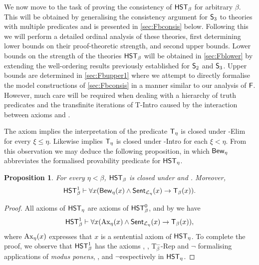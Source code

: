 \documentclass[UKenglish,cleveref,DIV=12]{scrartcl}
\newtheorem{proposition}[lemma]{Proposition}
\theoremstyle{definition}
\theoremstyle{definition}
\begin{document}
We now move to the task of proving the consistency of $\mathsf{HST}_\beta$ for arbitrary
$\beta$. This will be obtained by generalising the consistency argument for
$\mathsf{S}_3$ to theories with multiple predicates and is presented in
\cref{sec:Fbconsis} below. Following this we will perform a detailed ordinal
analysis of these theories, first determining lower bounds on their
proof-theoretic strength, and second upper bounds. Lower bounds on the strength
of the theories $\mathsf{HST}_\beta$ will be obtained in \cref{sec:Fblower} by
extending the well-ordering results previously established for $\mathsf{S}_2$ and
$\mathsf{S}_3$. Upper bounds are determined in \cref{sec:Fbupper1} where we
attempt to directly formalise the model constructions of \cref{sec:Fbconsis}
in a manner similar to our analysis of $\mathsf{F}$. However, much care will be required when
dealing with a hierarchy of truth predicates and the transfinite iterations of
T-Intro caused by the interaction between axioms \Uni\eta and \Rep\eta.

The axiom \Del\eta implies the interpretation of the predicate $\mathsf{T}_\eta$ is closed under \textT\xi-Elim for every $\xi\le\eta$. Likewise \Rep\eta implies $\mathsf{T}_\eta$ is closed under \textT\xi-Intro for each $\xi<\eta$. From this observation we may deduce the following proposition, in which $\mathsf{Bew}_\eta$ abbreviates the formalised provability predicate for $\mathsf{HST}_\eta$.
\begin{proposition}\label{prop:FFreflec}
 For every $\eta<\beta$, $\mathsf{HST}_\beta$ is closed under \Nec\eta and \Conec\eta. Moreover, \[\mathsf{HST}_\beta^1\vdash \forall x( \mathsf{Bew}_{\eta}(x)\land\mathsf{Sent}_{\mathcal{L}_\eta}(x)\rightarrow \mathsf{T}_\beta(x)).\]
\end{proposition}
\begin{proof}
All axioms of $\mathsf{HST}_\eta$ are axioms of $\mathsf{HST}_\beta^0$, and by \Nec\beta we have
\begin{align*}
  \mathsf{HST}_\beta^1\vdash \forall x( \mathrm{Ax}_{\eta}(x)\land\mathsf{Sent}_{\mathcal{L}_\eta}(x)\rightarrow \mathsf{T}_\beta(x)),
\end{align*}
where $\mathrm{Ax}_\eta(x)$ expresses that $x$ is a sentential axiom of $\mathsf{HST}_\eta$.
To complete the proof, we observe that $\mathsf{HST}_\beta^1$ has the axioms
\Imp\beta, \Del\beta, T$_\beta^-$-Rep and $\lnot$\Del\beta
formalising applications of \emph{modus ponens}, \Conec\eta, \Nec\eta and $\lnot$\Conec\eta respectively in $\mathsf{HST}_\eta$.
\end{proof}
\end{document}
